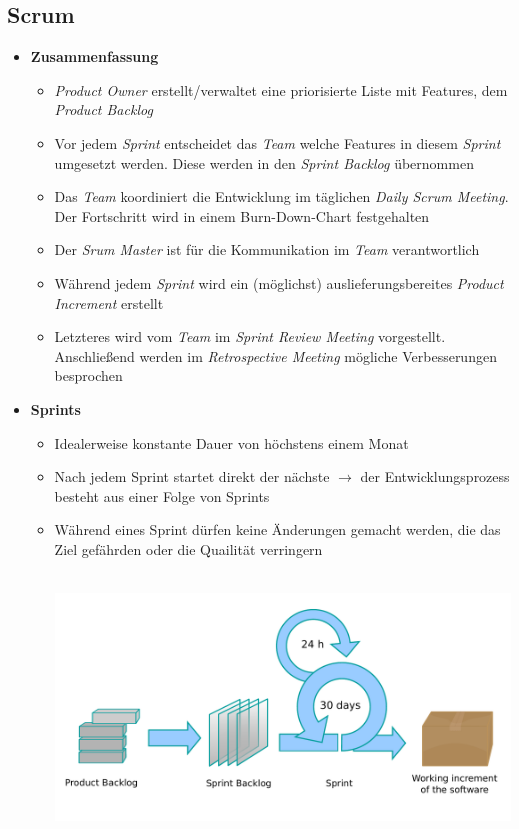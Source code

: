 \subsection{Scrum}
\begin{itemize}
	\item \textbf{Zusammenfassung}
	\begin{itemize}
		\item \textit{Product Owner} erstellt/verwaltet eine priorisierte Liste mit Features, dem \textit{Product Backlog}
		\item Vor jedem \textit{Sprint} entscheidet das \textit{Team} welche Features in diesem \textit{Sprint} umgesetzt werden. Diese werden in den \textit{Sprint Backlog} übernommen
		\item Das \textit{Team} koordiniert die Entwicklung im täglichen \textit{Daily Scrum Meeting}. Der Fortschritt wird in einem Burn-Down-Chart festgehalten
		\item Der \textit{Srum Master} ist für die Kommunikation im \textit{Team} verantwortlich
		\item Während jedem \textit{Sprint} wird ein (möglichst) auslieferungsbereites \textit{Product Increment} erstellt
		\item Letzteres wird vom \textit{Team} im \textit{Sprint Review Meeting} vorgestellt. Anschließend werden im \textit{Retrospective Meeting} mögliche Verbesserungen besprochen
	\end{itemize}
	\item \textbf{Sprints}
	\begin{itemize}
		\item Idealerweise konstante Dauer von höchstens einem Monat
		\item Nach jedem Sprint startet direkt der nächste \(\rightarrow\) der Entwicklungsprozess besteht aus einer Folge von Sprints
		\item Während eines Sprint dürfen keine Änderungen gemacht werden, die das Ziel gefährden oder die Quailität verringern\\\\
		\begin{minipage}{\linewidth}
			\includegraphics[scale=0.5]{swt2/scrum_process.pdf}

\end{minipage}
\end{itemize}
\end{itemize}
